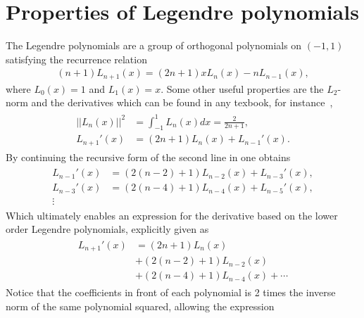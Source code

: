 
\chapter{Properties of Legendre polynomials} %

\label{AppendixA} %


The Legendre polynomials are a group of orthogonal polynomials on $(-1,1)$ satisfying the recurrence relation 
\begin{align}
    (n+1)L_{n+1}(x) = (2n+1)xL_{n}(x)-nL_{n-1}(x),
    \label{eq:Legendrerecursive}
\end{align}
where $L_0(x) = 1$ and $L_1(x) = x$. Some other useful properties are the $L_2$-norm and 
the derivatives which can be found in any texbook, for instance~\cite{Canuto},
\begin{align}
    \begin{split}
    ||L_n(x)||^2 &= \int_{-1}^1L_{n}(x)dx = \frac{2}{2n+1},  \\
    L_{n+1}'(x) &= (2n+1)L_n(x)+L_{n-1}'(x).
    \end{split}
    \label{eq:relations}
\end{align}
By continuing the recursive form of the second line in  one obtains
\begin{align}
    \begin{split}
    L_{n-1}'(x) &= (2(n-2)+1)L_{n-2}(x)+L_{n-3}'(x), \\
    L_{n-3}'(x) &= (2(n-4)+1)L_{n-4}(x)+L_{n-5}'(x), \\
    \vdots 
    \end{split}
    \label{eq:derivatives}
\end{align}
Which ultimately enables an expression for the derivative based on the lower order Legendre polynomials, explicitly given as 
\begin{align}
    \begin{split}
    L_{n+1}'(x) &= (2n+1)L_n(x)\\
    &+(2(n-2)+1)L_{n-2}(x)\\
    &+(2(n-4)+1)L_{n-4}(x)+\cdots 
    \end{split}
    \label{eq:der-explicit}
\end{align}
Notice that the coefficients in front of each polynomial is 2 times the inverse norm of the same polynomial squared, allowing the expression 
